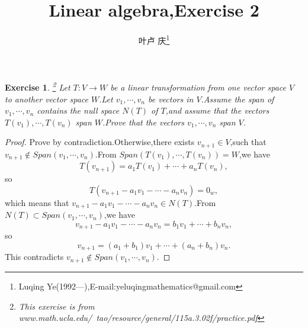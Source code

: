 \documentclass[a4paper]{article}
\newtheorem*{exe}{Exercise}
\newenvironment{exercise}
{\bigskip\begin{mdframed}\begin{exe}}
    {\end{exe}\end{mdframed}\bigskip}
\begin{document}
\title{\huge{\bf{Linear algebra,Exercise 2}}} \author{\small{叶卢
    庆\footnote{Luqing
      Ye(1992---),E-mail:yeluqingmathematics@gmail.com}}}
\maketitle
\begin{exercise}\footnote{This exercise is from
    www.math.ucla.edu/~tao/resource/general/115a.3.02f/practice.pdf}
  Let $T:V\to W$ be a linear transformation from one vector space $V$
  to another vector space $W$.Let $v_1,\cdots,v_n$ be vectors in
  $V$.Assume the span of $v_1,\cdots,v_n$ contains the null space
  $N(T)$ of $T$,and assume that the vectors $T(v_1),\cdots,T(v_n)$
  span $W$.Prove that the vectors $v_1,\cdots,v_n$ span $V$.
\end{exercise}
\begin{proof}
Prove by contradiction.Otherwise,there exists $v_{n+1}\in V$,such that
$v_{n+1}\not\in Span(v_1,\cdots,v_n)$.From $Span
(T(v_1),\cdots,T(v_n))=W$,we have
$$
T(v_{n+1})=a_1T(v_1)+\cdots+a_nT(v_n),
$$
so 
$$
T(v_{n+1}-a_1v_1-\cdots-a_nv_n)=0_w,
$$
which means that $v_{n+1}-a_1v_1-\cdots-a_nv_n\in N(T)$.From
$N(T)\subset Span (v_1,\cdots,v_n)$,we have
$$
v_{n+1}-a_1v_1-\cdots-a_nv_n=b_1v_1+\cdots+b_nv_n,
$$
so 
$$
v_{n+1}=(a_1+b_1)v_1+\cdots+(a_n+b_n)v_n.
$$
This contradicts $v_{n+1}\not\in Span (v_1,\cdots,v_n)$.
\end{proof}
\end{document}
